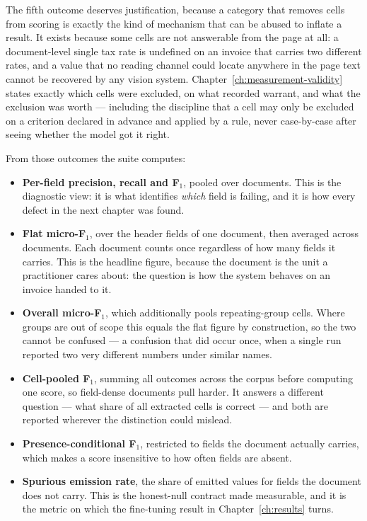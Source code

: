 The fifth outcome deserves justification, because a category that removes cells from scoring
is exactly the kind of mechanism that can be abused to inflate a result. It exists because
some cells are not answerable from the page at all: a document-level single tax rate is
undefined on an invoice that carries two different rates, and a value that no reading channel
could locate anywhere in the page text cannot be recovered by any vision system.
Chapter~\ref{ch:measurement-validity} states exactly which cells were excluded, on what
recorded warrant, and what the exclusion was worth --- including the discipline that a cell
may only be excluded on a criterion declared in advance and applied by a rule, never
case-by-case after seeing whether the model got it right.

From those outcomes the suite computes:

\begin{itemize}
  \item \textbf{Per-field precision, recall and F$_1$}, pooled over documents. This is the
        diagnostic view: it is what identifies \emph{which} field is failing, and it is how
        every defect in the next chapter was found.
  \item \textbf{Flat micro-F$_1$}, over the header fields of one document, then averaged
        across documents. Each document counts once regardless of how many fields it carries.
        This is the headline figure, because the document is the unit a practitioner cares
        about: the question is how the system behaves on an invoice handed to it.
  \item \textbf{Overall micro-F$_1$}, which additionally pools repeating-group cells. Where
        groups are out of scope this equals the flat figure by construction, so the two cannot
        be confused --- a confusion that did occur once, when a single run reported two very
        different numbers under similar names.
  \item \textbf{Cell-pooled F$_1$}, summing all outcomes across the corpus before computing
        one score, so field-dense documents pull harder. It answers a different question ---
        what share of all extracted cells is correct --- and both are reported wherever the
        distinction could mislead.
  \item \textbf{Presence-conditional F$_1$}, restricted to fields the document actually
        carries, which makes a score insensitive to how often fields are absent.
  \item \textbf{Spurious emission rate}, the share of emitted values for fields the document
        does not carry. This is the honest-null contract made measurable, and it is the metric
        on which the fine-tuning result in Chapter~\ref{ch:results} turns.
\end{itemize}

